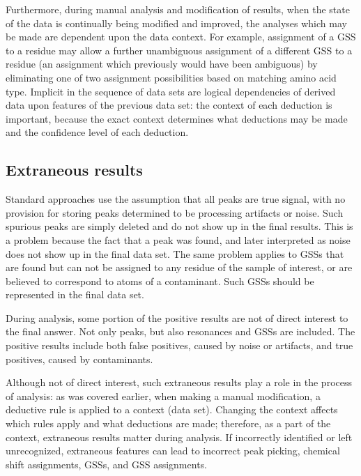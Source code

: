 
Furthermore, during manual analysis and modification of results, when the 
state of the data is continually being modified and improved, the analyses
which may be made are dependent upon the data context.
For example, assignment of a GSS to a residue may allow a further 
unambiguous assignment of a different GSS to a residue (an assignment 
which previously would have been ambiguous) by eliminating one of two 
assignment possibilities based on matching amino acid type.
Implicit in the sequence of data sets are logical dependencies of derived
data upon features of the previous data set: the context of each deduction
is important, because the exact context determines what deductions may be
made and the confidence level of each deduction. 



\subsection{Extraneous results}
Standard approaches use the 
assumption that all peaks are true signal, with no provision for storing peaks 
determined to be processing artifacts or noise.  Such spurious peaks are simply 
deleted and do not show up in the final results.  This is a problem because the 
fact that a peak was found, and later interpreted as noise does not show up in 
the final data set.  The same problem applies to GSSs that are found 
but can not be assigned to any residue of the sample of interest, or are 
believed to correspond to atoms of a contaminant.  Such GSSs should 
be represented in the final data set.

During analysis, some portion of the positive results are not of direct interest
to the final answer.  Not only peaks, but also resonances and GSSs are included.
The positive results include both false positives, caused by noise or
artifacts, and true positives, caused by contaminants.

Although not of direct interest, such extraneous results play a role in 
the process of analysis: as was covered earlier, when making a manual
modification, a deductive rule is applied to a context (data set).  Changing 
the context affects which rules apply and what deductions are made; 
therefore, as a part of the context, extraneous results matter during analysis. 
If incorrectly identified or left unrecognized, extraneous features can
lead to incorrect peak picking, chemical shift assignments, GSSs, and GSS
assignments.

